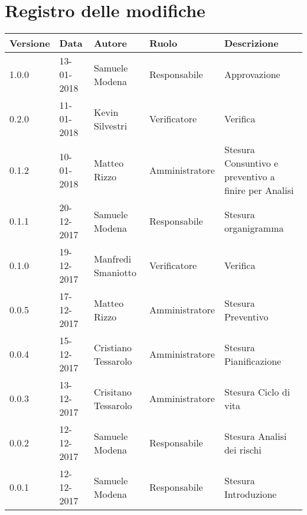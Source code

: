 \documentclass[./PianodiProgetto.tex]{subfiles}
\begin{document}
\chapter*{Registro delle modifiche}
\begin{center}	
	\begin{tabular}{|l|l|l|l|p{4cm}|}
		\hline
		\textbf{Versione} & \textbf{Data} & \textbf{Autore} & \textbf{Ruolo} & \textbf{Descrizione} \\ \hline
		\hline 1.0.0 & 13-01-2018 & Samuele Modena & Responsabile & Approvazione \\
 
		\hline 0.2.0 & 11-01-2018 & Kevin Silvestri & Verificatore & Verifica \\
 
		\hline 0.1.2 & 10-01-2018 & Matteo Rizzo & Amministratore & Stesura Consuntivo e preventivo a finire per Analisi \\
 
		\hline 0.1.1 & 20-12-2017 & Samuele Modena & Responsabile & Stesura organigramma \\
 
		\hline 0.1.0 & 19-12-2017 & Manfredi Smaniotto & Verificatore & Verifica \\
 
		\hline 0.0.5 & 17-12-2017 & Matteo Rizzo & Amministratore & Stesura Preventivo \\
 
		\hline 0.0.4 & 15-12-2017 & Cristiano Tessarolo & Amministratore & Stesura Pianificazione \\
 
		\hline 0.0.3 & 13-12-2017 & Crisitano Tessarolo & Amministratore & Stesura Ciclo di vita \\
 
		\hline 0.0.2 & 12-12-2017 & Samuele Modena & Responsabile & Stesura Analisi dei rischi \\
 
		\hline 0.0.1 & 12-12-2017 & Samuele Modena & Responsabile & Stesura Introduzione \\
 
		\hline
 
	\end{tabular}
\end{center}	
\end{document}
